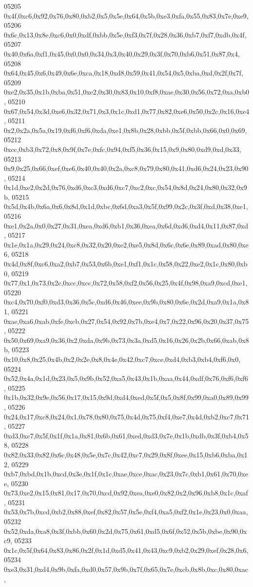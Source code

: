 \begin{DoxyCode}
05205   0x4f,0xc6,0x92,0x76,0x80,0xb2,0x5,0x5e,0x64,0x5b,0xe3,0xfa,0x55,0x83,0x7e,0xe9,
05206   0x6c,0x13,0x8e,0xc6,0x0,0xdf,0xbb,0x5e,0xf3,0x7f,0x28,0x36,0xb7,0xf7,0xdb,0x4f,
05207   0x40,0x6a,0xf1,0x45,0x0,0x0,0x34,0x3,0x40,0x29,0x3f,0x70,0xb6,0x51,0x87,0x4,
05208   0x64,0x45,0x6,0x49,0x6e,0xca,0x18,0xd8,0x59,0x41,0x54,0x5,0xba,0xd,0x2f,0x7f,
05209   0xe2,0x35,0x1b,0xba,0x51,0xe2,0x30,0x83,0x10,0xf8,0xae,0x30,0x56,0x72,0xa,0xb0,
05210   0x67,0x54,0x3d,0xe6,0x32,0x71,0x3,0x1c,0xd1,0x77,0x82,0xe6,0x50,0x2c,0x16,0xe4,
05211   0x2,0x2a,0x5a,0x19,0xf6,0xf6,0xda,0xe1,0x8b,0x28,0xbb,0x5f,0xbb,0x66,0x0,0x69,
05212   0xcc,0xb3,0x72,0x8,0x9f,0x7e,0xfc,0x94,0xf5,0x36,0x15,0x9,0x80,0xd9,0xd,0x33,
05213   0x9,0x25,0x66,0xef,0xe6,0x40,0x40,0x2a,0xc8,0x79,0x80,0x41,0xd6,0x24,0x23,0x90,
05214   0x1d,0xe2,0x2d,0x76,0xd6,0xc3,0xd6,0xc7,0xc2,0xc,0x54,0x8d,0x24,0x80,0x32,0x9b,
05215   0x5d,0x4b,0x6a,0x6,0x8d,0x1d,0xbc,0x6d,0xa3,0x5f,0x99,0x2c,0x3f,0xd,0x38,0xe1,
05216   0xe1,0x2a,0x0,0x27,0x31,0xea,0xd6,0xb1,0x36,0xea,0x6d,0xd6,0xd4,0x11,0x87,0xd,
05217   0x1e,0x1a,0x29,0x24,0xc8,0x32,0x20,0xe2,0xe5,0x8d,0x6c,0x6e,0x89,0xad,0x80,0xe6,
05218   0x4d,0x8f,0xc6,0xa2,0xb7,0x53,0x6b,0xe1,0xf1,0x1c,0x58,0x22,0xe2,0x1c,0x80,0xb0,
05219   0x77,0x1,0x73,0x2c,0xcc,0xcc,0x72,0x58,0xf2,0x56,0x25,0x4f,0x98,0xa9,0xcd,0xe1,
05220   0xc4,0x70,0xf0,0xd3,0x36,0x5c,0xd6,0x46,0xee,0x9b,0x80,0x6e,0x2d,0xa9,0x1a,0x81,
05221   0xae,0xa6,0xab,0xfe,0xcb,0x27,0x54,0x92,0x7b,0xe4,0x7,0x22,0x96,0x20,0x37,0x75,
05222   0x50,0x69,0xa9,0x36,0x2,0xda,0x9b,0x73,0x3a,0xd5,0x16,0x26,0x2b,0x66,0xab,0x8b,
05223   0x10,0x8,0x25,0x4b,0x2,0x2e,0x8,0x4e,0x42,0xc7,0xce,0xd4,0xb3,0xb4,0xf6,0x0,
05224   0x52,0x4a,0x1d,0x23,0x5,0x9b,0x52,0xa5,0x43,0x1b,0xaa,0x44,0xdf,0x76,0xf6,0xf6,
05225   0x1b,0x32,0x9e,0x56,0x17,0x15,0x9d,0xd4,0xed,0x5f,0x5,0x8f,0x99,0xa0,0x89,0x99,
05226   0x24,0x17,0xc8,0x24,0x1,0x78,0x80,0x75,0x4d,0x75,0xf4,0xe7,0x4d,0xb2,0xc7,0x71,
05227   0xd3,0xc7,0x5f,0x1f,0x1a,0x81,0x6b,0x61,0xed,0xd3,0x7e,0x1b,0xdb,0x3f,0xb4,0x58,
05228   0x82,0x33,0x82,0x6c,0x48,0x5e,0x7c,0x42,0xc7,0x29,0x8f,0xee,0x15,0xb6,0xba,0x12,
05229   0xb7,0xbd,0x1b,0xcd,0x3e,0x1f,0x1c,0xae,0xce,0xac,0x23,0x7c,0xb1,0x61,0x70,0xee,
05230   0x73,0xe2,0x15,0x81,0x17,0x70,0xcd,0x92,0xea,0xe0,0x82,0x2,0x96,0xb8,0x1c,0xaf,
05231   0x53,0x7b,0xcd,0xb2,0x88,0xef,0x82,0x57,0x5e,0xf4,0xa5,0xf2,0x1e,0x23,0x0,0xaa,
05232   0x52,0xda,0xa8,0x3f,0xbb,0x60,0x2d,0x75,0x61,0xd5,0x6f,0x52,0x5b,0xbe,0x90,0xc9,
05233   0x1c,0x5f,0x64,0x83,0x86,0x2f,0x1d,0xd5,0x41,0x43,0xc9,0xb2,0x29,0xef,0x28,0x6,
05234   0xe3,0x31,0xd4,0x9b,0xfa,0xd0,0x57,0x9b,0x7f,0x65,0x7e,0xcb,0x8b,0xc,0x80,0xac,

\end{DoxyCode}
